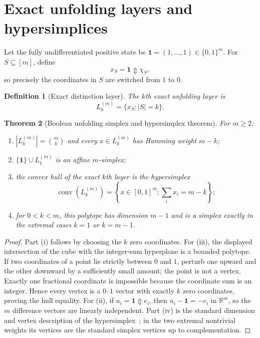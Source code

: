 \documentclass[11pt]{article}
\newtheorem{theorem}{Theorem}[section]
\newtheorem{definition}[theorem]{Definition}
\newcommand{\Updown}{\mathbin{\Updownarrow}}
\begin{document}
\section{Exact unfolding layers and hypersimplices}

Let the fully undifferentiated positive state be $\mathbf 1=(1,\dots,1)\in\{0,1\}^m$.  For $S\subseteq[m]$, define
\[
x_S=\mathbf 1\Updown \chi_S,
\]
so precisely the coordinates in $S$ are switched from $1$ to $0$.

\begin{definition}[Exact distinction layer]
The $k$th exact unfolding layer is
\[
L_k^{(m)}=\{x_S:|S|=k\}.
\]
\end{definition}

\begin{theorem}[Boolean unfolding simplex and hypersimplex theorem]\label{thm:hypersimplex}
For $m\ge2$:
\begin{enumerate}[label=(\roman*)]
\item $|L_k^{(m)}|=\binom{m}{k}$ and every $x\in L_k^{(m)}$ has Hamming weight $m-k$;
\item $\{\mathbf1\}\cup L_1^{(m)}$ is an affine $m$-simplex;
\item the convex hull of the exact $k$th layer is the hypersimplex
\[
\operatorname{conv}(L_k^{(m)})
=\left\{x\in[0,1]^m:\sum_i x_i=m-k\right\};
\]
\item for $0<k<m$, this polytope has dimension $m-1$ and is a simplex exactly in the extremal cases $k=1$ or $k=m-1$.
\end{enumerate}
\end{theorem}
\begin{proof}
Part (i) follows by choosing the $k$ zero coordinates.  For (iii),
the displayed intersection of the cube with the integer-sum hyperplane is a
bounded polytope.  If two coordinates of a point lie strictly between $0$
and $1$, perturb one upward and the other downward by a sufficiently small
amount; the point is not a vertex.  Exactly one fractional coordinate is
impossible because the coordinate sum is an integer.  Hence every vertex
is a $0$--$1$ vector with exactly $k$ zero coordinates, proving the hull
equality.  For (ii), if $u_i=\mathbf1\Updown e_i$, then $u_i-\mathbf1=-e_i$ in $\mathbb R^m$, so the $m$ difference vectors are linearly independent.  Part (iv) is the standard dimension and vertex description of the hypersimplex~\cite{GelfandEtAlHypersimplex}; in the two extremal nontrivial weights its vertices are the standard simplex vertices up to complementation.
\end{proof}
\end{document}
